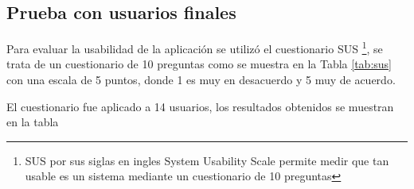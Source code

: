 \subsection{Prueba con usuarios finales}
Para evaluar la usabilidad de la aplicación se utilizó el cuestionario SUS \footnote{SUS por sus siglas en ingles System Usability Scale permite medir que tan usable es un sistema mediante un cuestionario de 10 preguntas }, se trata de un cuestionario de 10 preguntas como se muestra en la Tabla \ref{tab:sus} con una escala de 5 puntos, donde 1 es muy en desacuerdo y 5 muy de acuerdo. 



El cuestionario fue aplicado a 14 usuarios, los resultados obtenidos se muestran en la tabla 
